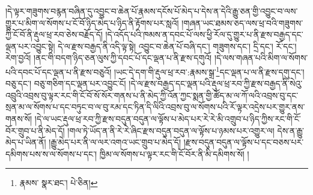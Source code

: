 །དེ་ལྟར་གཟུགས་བརྙན་བཞིན་དུ་འབྱུང་བ་ཆེན་པོ་རྣམས་དངོས་པོ་མེད་པ་དེས་ན་དེའི་རྒྱུ་ཅན་གྱི་འབྱུང་བ་ལས་གྱུར་པ་མིག་ལ་སོགས་པ་ངོ་བོ་ཉིད་མེད་པ་ཉིད་ནི་རྟོགས་པར་སླའོ། །གཞན་ཡང་ཐམས་ཅད་ལས་ཕྲ་བའི་གཟུགས་ཀྱི་ངོ་བོ་ནི་རྡུལ་ཕྲ་རབ་ཅེས་བརྗོད་དོ། །དེ་འདོད་པའི་ཁམས་ན་དབང་པོ་ལས་ཕྱི་རོལ་དུ་གྱུར་པ་ནི་རྫས་བརྒྱད་དང་ལྡན་པར་འབྱུང་སྟེ། དེ་ལ་རྫས་བརྒྱད་ནི་འདི་ལྟ་སྟེ། འབྱུང་བ་ཆེན་པོ་བཞི་དང་། གཟུགས་དང་། དྲི་དང་། རོ་དང་། རེག་བྱའོ། །ནང་གི་བདག་ཉིད་ཅན་ལུས་ཀྱི་དབང་པོ་དང་ལྡན་པ་ནི་རྫས་དགུའོ། །དེ་ལས་གཞན་པའི་མིག་ལ་སོགས་པའི་དབང་པོ་དང་ལྡན་པ་ནི་རྫས་བཅུའོ། །ཡང་དེ་དག་གི་རྡུལ་ཕྲ་རབ་:རྣམས་སྒྲ་\footnote{རྣམས་  སྣར་ཐང་།  པེ་ཅིན། }དང་ལྡན་པ་ལ་ནི་རྫས་དགུ་དང་། བཅུ་དང་། བཅུ་གཅིག་དང་ལྡན་པར་འབྱུང་ངོ། །དེ་ལ་རྫས་བརྒྱད་དང་ལྡན་པའི་རྡུལ་ཕྲ་རབ་ཀྱི་རྫས་བརྒྱད་ནི་སེའུ་འབྲུའི་འབྲས་བུ་ལྟར་རང་གི་ངོ་བོ་སོ་སོར་གནས་པ་ནི་མེད་ཀྱི་འོན་ཀྱང་སྨན་གྱི་ཚོད་མ་ལ་ཀོ་ལའི་འབྲས་བུ་དང་སྲན་མ་ལ་སོགས་པ་དང་བཏུང་བ་ལ་བུ་རམ་དང་ཏིན་དི་ལིའི་འབྲས་བུ་ལ་སོགས་པའི་རོ་ལྟར་འདྲེས་པར་གྱུར་ནས་གནས་སོ། །དེ་ལ་ཡང་རྡུལ་ཕྲ་རབ་ཀྱི་རྫས་བདུན་བདུན་ལ་ལྟོས་པ་མེད་པར་རེ་རེ་མི་འགྲུབ་པ་ཉིད་ཀྱིས་རང་གི་ངོ་བོར་གྲུབ་པ་ནི་མེད་དོ། །གལ་ཏེ་ཡོད་ན་ནི་རེ་རེ་ཞིང་རྫས་བདུན་བདུན་ལ་ལྟོས་པ་ཉམས་པར་འགྱུར་ལ། དེས་ན་རྒྱུ་མེད་པ་ཡིན་ནོ། །རྒྱུ་མེད་པར་ནི་ལ་ལར་འགའ་ཡང་གྲུབ་པ་མེད་དོ། །རྫས་བདུན་བདུན་ལ་ལྟོས་པ་དང་བཅས་པར་དམིགས་པས་ས་ལ་སོགས་པ་དང་། ཁྱིམ་ལ་སོགས་པ་ལྟར་རང་གི་ངོ་བོར་ནི་མི་དམིགས་སོ། །
